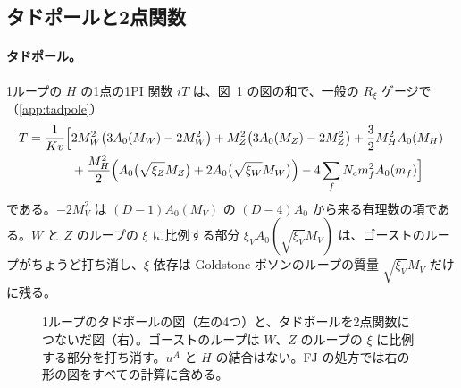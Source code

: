 \documentclass[a4paper,10pt]{ltjsarticle}
\begin{document}
\subsection{タドポールと2点関数}\label{sec:tadpole}

\paragraph{タドポール。}1ループの $H$ の1点の1PI 関数 $iT$ は、図~\ref{fig:tadpole} の図の和で、一般の $R_\xi$ ゲージで（\ref{app:tadpole}）
\begin{equation}
\begin{aligned}
T=\frac1{Kv}\Bigl[&2M_W^2\bigl(3A_0(M_W)-2M_W^2\bigr)+M_Z^2\bigl(3A_0(M_Z)-2M_Z^2\bigr)+\frac32M_H^2A_0(M_H)\\
&+\frac{M_H^2}2\Bigl(A_0\bigl(\sqrt{\xi_Z}M_Z\bigr)+2A_0\bigl(\sqrt{\xi_W}M_W\bigr)\Bigr)-4\sum_fN_cm_f^2A_0(m_f)\Bigr]
\end{aligned}
\label{eq:T}
\end{equation}
である。$-2M_V^2$ は $(D-1)A_0(M_V)$ の $(D-4)A_0$ から来る有理数の項である。$W$ と $Z$ のループの $\xi$ に比例する部分 $\xi_VA_0(\sqrt{\xi_V}M_V)$ は、ゴーストのループがちょうど打ち消し、$\xi$ 依存は Goldstone ボソンのループの質量 $\sqrt{\xi_V}M_V$ だけに残る。

\begin{figure}[tbp]
\centering
{}
\caption{1ループのタドポールの図（左の4つ）と、タドポールを2点関数につないだ図（右）。ゴーストのループは $W$、$Z$ のループの $\xi$ に比例する部分を打ち消す。$u^A$ と $H$ の結合はない。FJ の処方では右の形の図をすべての計算に含める。}
\label{fig:tadpole}
\end{figure}
\end{document}
